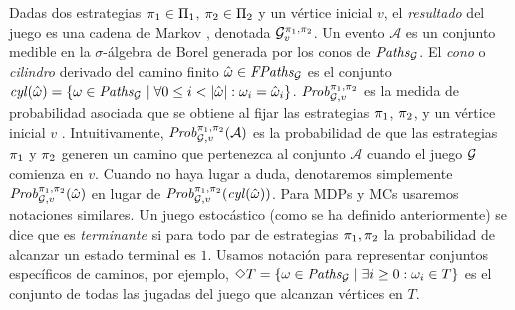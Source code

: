 	Dadas dos estrategias $\pi_{1} \in \Pi_{1}$, $\pi_{2} \in \Pi_{2}$ y un vértice inicial $v$,  el \emph{resultado} del juego es una cadena de Markov \cite{ChatterjeeH12}, denotada 
$\mathcal{G}^{\pi_{1}, \pi_{2}}_v$. Un evento $\mathcal{A}$ es un conjunto medible en la $\sigma$-álgebra de Borel generada por los conos de $\mathit{Paths}_{\mathcal{G}}$. El \emph{cono} o \emph{cilindro} derivado del camino finito $\hat{\omega} \in \mathit{FPaths}_{\mathcal{G}}$ es el conjunto $\mathit{cyl}(\hat{\omega})=\{\omega \in \mathit{Paths}_{\mathcal{G}} \mid \forall 0 \leq i < |\hat{\omega}|: \omega_i = \hat{\omega}_i \}$. $\mathit{Prob}^{\pi_{1}, \pi_{2}}_{\mathcal{G},v}$ es la medida de probabilidad asociada que se obtiene al fijar las estrategias $\pi_{1}$, $\pi_{2}$, y un vértice inicial $v$  \cite{ChatterjeeH12}. Intuitivamente, $\mathit{Prob}^{\pi_{1}, \pi_{2}}_{\mathcal{G},v}(\mathcal{A})$
es la probabilidad de que las estrategias $\pi_{1}$ y $\pi_{2}$ generen un camino que pertenezca al conjunto $\mathcal{A}$ cuando el juego $\mathcal{G}$ comienza en $v$. Cuando no haya lugar a duda, denotaremos simplemente $\mathit{Prob}^{\pi_{1}, \pi_{2}}_{\mathcal{G},v}(\hat{\omega})$ en lugar de $\mathit{Prob}^{\pi_{1}, \pi_{2}}_{\mathcal{G},v}(\mathit{cyl}(\hat{\omega}))$.
Para MDPs y MCs usaremos notaciones similares. Un juego estocástico (como se ha definido anteriormente) se dice que es \emph{terminante} \cite{Condon92} si para todo par de estrategias $\pi_{1}, \pi_{2}$ la probabilidad de alcanzar un estado terminal es $1$. Usamos notación {\LTL} para representar conjuntos específicos de caminos, por ejemplo, $\Diamond T = \{\omega \in \mathit{Paths}_{\mathcal{G}} \mid \exists i \geq 0 : \omega_i \in T \}$ es el conjunto de todas las jugadas del juego que alcanzan vértices en $T$.




